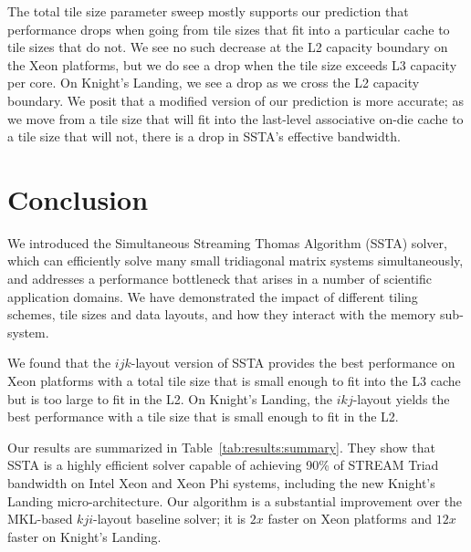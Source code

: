\documentclass[10pt, conference, compsocconf]{IEEEtran}
\newcommand{\textapprox}{\texttildelow}
\begin{document}
The total tile size parameter sweep mostly supports our prediction that
  performance drops when going from tile sizes that fit into a particular cache
  to tile sizes that do not.
We see no such decrease at the L2 capacity boundary on the Xeon platforms, but
  we do see a drop when the tile size exceeds L3 capacity per core.
On Knight's Landing, we see a drop as we cross the L2 capacity boundary.
We posit that a modified version of our prediction is more accurate; as we move
  from a tile size that will fit into the last-level associative on-die cache
  to a tile size that will not, there is a drop in SSTA's effective bandwidth.

\section{Conclusion}
\label{sec:conclusion}


We introduced the Simultaneous Streaming Thomas Algorithm (SSTA) solver, which
  can efficiently solve many small tridiagonal matrix systems simultaneously, 
  and addresses a performance bottleneck
  that arises in a number of scientific application domains.
We have demonstrated the impact of different tiling schemes, tile sizes
  and data layouts, and how they interact with the memory sub-system.

We found that the \(ijk\)-layout version of SSTA provides the best performance
  on Xeon platforms with a total tile size that is small enough to fit into 
  the L3 cache but is too large to fit in the L2.
On Knight's Landing, the \(ikj\)-layout yields the best performance with a
  tile size that is small enough to fit in the L2.

Our results are summarized in Table~\ref{tab:results:summary}.
They show that SSTA is a highly efficient solver capable of achieving 90\%
  of STREAM Triad bandwidth on Intel Xeon and Xeon Phi systems, including the new
  Knight's Landing micro-architecture.
Our algorithm is a substantial improvement over the MKL-based \(kji\)-layout
  baseline solver; it is \textapprox \(2x\) faster on Xeon platforms and
  \textapprox \(12x\) faster on Knight's Landing.
\end{document}
